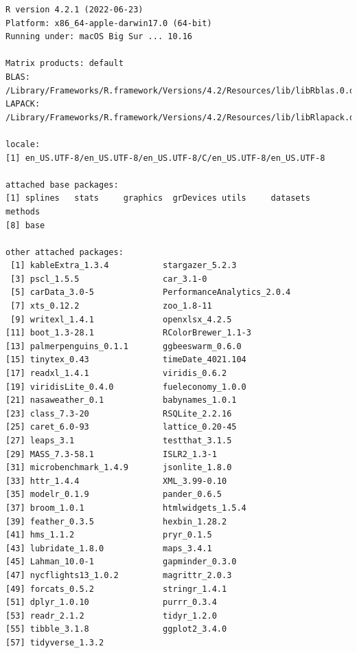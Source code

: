 \documentclass[
  12pt,
  a4paper,
  DIV=11,
  numbers=noendperiod]{scrartcl}
\begin{document}
\begin{verbatim}
R version 4.2.1 (2022-06-23)
Platform: x86_64-apple-darwin17.0 (64-bit)
Running under: macOS Big Sur ... 10.16

Matrix products: default
BLAS:   /Library/Frameworks/R.framework/Versions/4.2/Resources/lib/libRblas.0.dylib
LAPACK: /Library/Frameworks/R.framework/Versions/4.2/Resources/lib/libRlapack.dylib

locale:
[1] en_US.UTF-8/en_US.UTF-8/en_US.UTF-8/C/en_US.UTF-8/en_US.UTF-8

attached base packages:
[1] splines   stats     graphics  grDevices utils     datasets  methods  
[8] base     

other attached packages:
 [1] kableExtra_1.3.4           stargazer_5.2.3           
 [3] pscl_1.5.5                 car_3.1-0                 
 [5] carData_3.0-5              PerformanceAnalytics_2.0.4
 [7] xts_0.12.2                 zoo_1.8-11                
 [9] writexl_1.4.1              openxlsx_4.2.5            
[11] boot_1.3-28.1              RColorBrewer_1.1-3        
[13] palmerpenguins_0.1.1       ggbeeswarm_0.6.0          
[15] tinytex_0.43               timeDate_4021.104         
[17] readxl_1.4.1               viridis_0.6.2             
[19] viridisLite_0.4.0          fueleconomy_1.0.0         
[21] nasaweather_0.1            babynames_1.0.1           
[23] class_7.3-20               RSQLite_2.2.16            
[25] caret_6.0-93               lattice_0.20-45           
[27] leaps_3.1                  testthat_3.1.5            
[29] MASS_7.3-58.1              ISLR2_1.3-1               
[31] microbenchmark_1.4.9       jsonlite_1.8.0            
[33] httr_1.4.4                 XML_3.99-0.10             
[35] modelr_0.1.9               pander_0.6.5              
[37] broom_1.0.1                htmlwidgets_1.5.4         
[39] feather_0.3.5              hexbin_1.28.2             
[41] hms_1.1.2                  pryr_0.1.5                
[43] lubridate_1.8.0            maps_3.4.1                
[45] Lahman_10.0-1              gapminder_0.3.0           
[47] nycflights13_1.0.2         magrittr_2.0.3            
[49] forcats_0.5.2              stringr_1.4.1             
[51] dplyr_1.0.10               purrr_0.3.4               
[53] readr_2.1.2                tidyr_1.2.0               
[55] tibble_3.1.8               ggplot2_3.4.0             
[57] tidyverse_1.3.2           


\end{verbatim}
\end{document}
